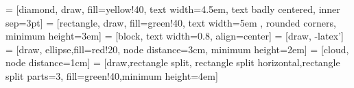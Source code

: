 \usepackage{latexsym,multicol,color,pstricks}

\headheight 15pt

 = [diamond, draw, fill=yellow!40, text width=4.5em, text badly centered, inner sep=3pt]
 = [rectangle, draw, fill=green!40, text width=5em	, rounded corners, minimum height=3em]
 = [block, text width=0.8\textwidth, align=center]
 = [draw, -latex']
 = [draw, ellipse,fill=red!20, node distance=3cm, minimum height=2em]
 = [cloud, node distance=1cm]
 = [draw,rectangle split, rectangle split horizontal,rectangle split parts=3, fill=green!40,minimum height=4em]

\overfullrule=2cm




